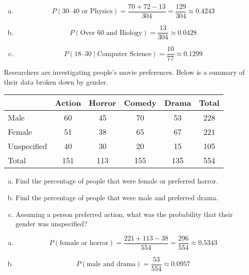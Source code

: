 \documentclass[12pt,letterpaper]{exam}
\begin{document}
\begin{questions}
\sol 
\begin{enumerate}[(a)]
\item 
	\[
	P(\text{30--40 or Physics})= \dfrac{70 + 72 - 13}{304}= \dfrac{129}{304} \approx 0.4243
	\] \pspace
	
\item 
	\[
	P(\text{Over 60 and Biology})= \dfrac{13}{304} \approx 0.0428
	\] \pspace

\item 
	\[
	P(\text{18--30} \;|\; \text{Computer Science})= \dfrac{10}{77} \approx 0.1299
	\]
\end{enumerate}



\newpage
\question[10] Researchers are investigating people's movie preferences. Below is a summary of their data broken down by gender. \par
	\begin{table}[!ht]
	\centering
	\begin{tabular}{|l||c|c|c|c||c|} \hline
	& Action & Horror & Comedy & Drama & Total \\ \hline
	Male & 60 & 45 & 70 & 53 & 228 \\ \hline
	Female & 51 & 38 & 65 & 67 & 221 \\ \hline 
	Unspecified & 40 & 30 & 20 & 15 & 105 \\ \hline \hline
	Total & 151 & 113 & 155 & 135 & 554 \\ \hline
	\end{tabular}
	\end{table} \par

\begin{enumerate}[(a)]
\item Find the percentage of people that were female or preferred horror. 
\item Find the percentage of people that were male and preferred drama.
\item Assuming a person preferred action, what was the probability that their gender was unspecified? 
\end{enumerate} \pspace

\sol 
\begin{enumerate}[(a)]
\item 
	\[
	P(\text{female or horror})= \dfrac{221 + 113 - 38}{554}= \dfrac{296}{554} \approx 0.5343
	\] \pspace

\item 
	\[
	P(\text{male and drama})= \dfrac{53}{554} \approx 0.0957
	\] \pspace


\end{enumerate}
\end{questions}
\end{document}
